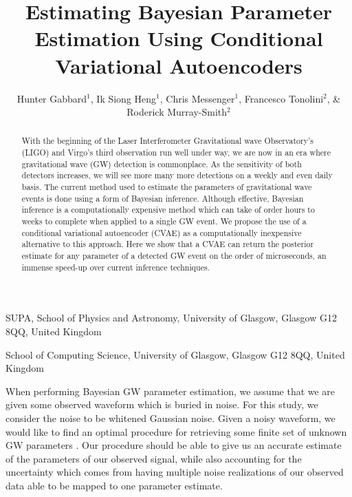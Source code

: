 \documentclass{nature}
\title{Estimating Bayesian Parameter Estimation Using Conditional Variational Autoencoders}
\author{Hunter Gabbard$^{1}$, Ik Siong Heng$^1$, Chris Messenger$^1$, Francesco Tonolini$^2$, \& Roderick Murray-Smith$^2$}
\begin{document}
\maketitle

\begin{affiliations}
 \item SUPA, School of Physics and Astronomy, University of Glasgow, Glasgow G12 8QQ, United Kingdom
 \item School of Computing Science, University of Glasgow, Glasgow G12 8QQ, United Kingdom
\end{affiliations}

\begin{abstract}
With the beginning of the Laser Interferometer Gravitational wave Observatory's (LIGO) and Virgo's third observation run well under way, we are now in an era where gravitational wave (GW) detection is commonplace. As the sensitivity of both detectors increases, we will see more many more detections on a weekly and even daily basis.  The current method used to estimate the parameters of gravitational wave events is done using a form of Bayesian inference. Although effective, Bayesian inference is a computationally expensive method which can take of order hours to weeks to complete when applied to a single GW event. We propose the use of a conditional variational autoencoder (CVAE) as a computationally inexpensive alternative to this approach. Here we show that a CVAE can return the posterior estimate for any parameter of a detected GW event on the order of microseconds, an immense speed-up over current inference techniques.

\end{abstract}

When performing Bayesian GW parameter estimation, we assume that we are given some observed waveform which is buried in noise. For this study, we consider the noise to be whitened Gaussian noise. Given a noisy waveform, we would like to find an optimal procedure for retrieving some finite set of unknown GW parameters \cite{Jaranowski2012}. Our procedure should be able to give us an accurate estimate of the parameters of our observed signal, while also accounting for the uncertainty which comes from having multiple noise realizations of our observed data able to be mapped to one parameter estimate.
\end{document}
